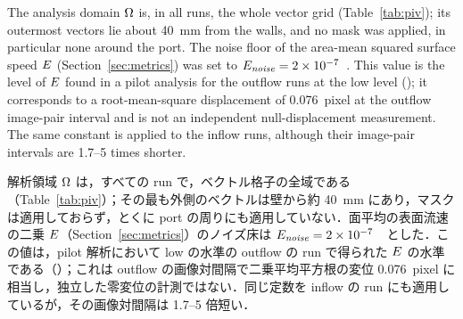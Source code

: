 \begin{en}[M4-4]
The analysis domain $\Omega$ is, in all runs, the whole vector grid (Table~\ref{tab:piv}); its outermost vectors lie about 40~mm from the walls, and no mask was applied, in particular none around the port. The noise floor of the area-mean squared surface speed $E$ (Section~\ref{sec:metrics}) was set to $E_{\mathit{noise}} = 2 \times 10^{-7}$~\sqmpss. This value is the level of $E$ found in a pilot analysis for the outflow runs at the low level (); it corresponds to a root-mean-square displacement of 0.076~pixel at the outflow image-pair interval and is not an independent null-displacement measurement. The same constant is applied to the inflow runs, although their image-pair intervals are 1.7--5 times shorter.
\end{en}
\begin{ja}
解析領域 $\Omega$ は，すべての run で，ベクトル格子の全域である（Table~\ref{tab:piv}）；その最も外側のベクトルは壁から約 40~mm にあり，マスクは適用しておらず，とくに port の周りにも適用していない．面平均の表面流速の二乗 $E$（Section~\ref{sec:metrics}）のノイズ床は $E_{\mathit{noise}} = 2 \times 10^{-7}$~\sqmpss\ とした．この値は，pilot 解析において low の水準の outflow の run で得られた $E$ の水準である（）；これは outflow の画像対間隔で二乗平均平方根の変位 0.076~pixel に相当し，独立した零変位の計測ではない．同じ定数を inflow の run にも適用しているが，その画像対間隔は 1.7--5 倍短い．
\end{ja}

